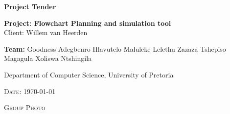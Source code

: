\begin{titlepage}
	\begin{center}
		
		\textbf{\huge Project Tender } \\
		\vfill

		\textbf{\large Project: Flowchart Planning and simulation tool} \\
		{\large Client: Willem van Heerden } \\ 
		
		
		\begin{flushright} \large
			\textbf{Team:}\newline
			Goodness Adegbenro\newline
			Hlavutelo Maluleke\newline
			Lelethu Zazaza\newline
			Tshepiso Magagula\newline
			Xoliswa Ntshingila\newline
		\end{flushright}
		{\large Department of Computer Science, University of Pretoria } \\ 
		
	

		\vfill

		

		\textsc{\large Date: \today}	

		\vfill
	
		\textsc{\large Group Photo } \\ 	
		
		
	\end{center}
\end{titlepage}
